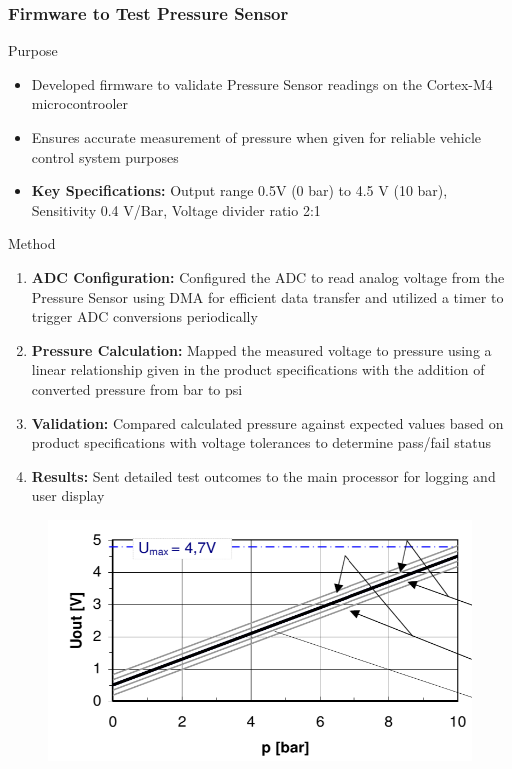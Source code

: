 \documentclass[8pt,compress]{beamer}
\newcommand\LightBold[1]{\textcolor{VSBlueLight}{\textbf{#1}}}
\begin{document}
\begin{frame}
    \frametitle{Firmware to Test Pressure Sensor}
    \begin{block}{Purpose}
        \small{
            \begin{itemize}
                \item Developed firmware to validate Pressure Sensor readings on the Cortex-M4 microcontrooler
                \item Ensures accurate measurement of pressure when given for reliable vehicle control system purposes
                \item \LightBold{Key Specifications:} Output range 0.5V (0 bar) to 4.5 V (10 bar), Sensitivity 0.4 V/Bar, Voltage divider ratio 2:1
            \end{itemize}
        }
    \end{block}
    \hspace{-0.5cm}
    \begin{minipage}{0.485\textwidth}
        \begin{block}{Method}
            \small{
                \begin{enumerate}
                    \tiny
                    \item \LightBold{ADC Configuration:} Configured the ADC to read analog voltage from the Pressure Sensor using DMA for efficient data transfer and utilized a timer to trigger ADC conversions periodically
                    \item \LightBold{Pressure Calculation:} Mapped the measured voltage to pressure using a linear relationship given in the product specifications with the addition of converted pressure from bar to psi
                    \item \LightBold{Validation:} Compared calculated pressure against expected values based on product specifications with voltage tolerances to determine pass/fail status
                    \item \LightBold{Results:} Sent detailed test outcomes to the main processor for logging and user display
                \end{enumerate}
            }
        \end{block}
    \end{minipage}
    \hfill
    \begin{minipage}{0.50\textwidth}
        \begin{figure}
            \centering
            \includegraphics[width=\textwidth]{assets/specs/adc_product_specs.png}

\end{figure}
\end{minipage}
\end{frame}
\end{document}
